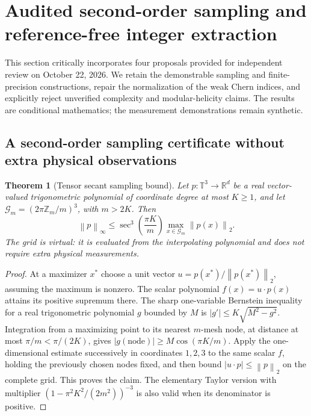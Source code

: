 \documentclass[aps,prd,onecolumn,notitlepage,11pt,superscriptaddress,longbibliography]{revtex4-2}
\newtheorem{theorem}{Theorem}
\newcommand{\norm}[1]{\left\lVert#1\right\rVert}
\begin{document}
\section{Audited second-order sampling and reference-free integer extraction}\label{sec:v6}

This section critically incorporates four proposals provided for independent review on October 22, 2026. We retain the demonstrable sampling and finite-precision constructions, repair the normalization of the weak Chern indices, and explicitly reject unverified complexity and modular-helicity claims. The results are conditional mathematics; the measurement demonstrations remain synthetic.

\subsection{A second-order sampling certificate without extra physical observations}

\begin{theorem}[Tensor secant sampling bound]\label{th:v6secant}
Let $p:\mathbb T^3\to\mathbb R^d$ be a real vector-valued trigonometric polynomial of coordinate degree at most $K\ge1$, and let $\mathcal G_m=(2\pi\mathbb Z_m/m)^3$, with $m>2K$. Then
\begin{equation}\label{eq:v6secant}
\boxed{\norm{p}_{\infty}\le \sec^3\!\left(\frac{\pi K}{m}\right)\max_{x\in\mathcal G_m}\norm{p(x)}_2.}
\end{equation}
The grid is \emph{virtual}: it is evaluated from the interpolating polynomial and does not require extra physical measurements.
\end{theorem}
\begin{proof}
At a maximizer $x^*$ choose a unit vector $u=p(x^*)/\norm{p(x^*)}_2$, assuming the maximum is nonzero. The scalar polynomial $f(x)=u\cdot p(x)$ attains its positive supremum there. The sharp one-variable Bernstein inequality for a real trigonometric polynomial $g$ bounded by $M$ is $|g'|\le K\sqrt{M^2-g^2}$. Integration from a maximizing point to its nearest $m$-mesh node, at distance at most $\pi/m<\pi/(2K)$, gives $|g(\mathrm{node})|\ge M\cos(\pi K/m)$. Apply the one-dimensional estimate successively in coordinates $1,2,3$ to the same scalar $f$, holding the previously chosen nodes fixed, and then bound $|u\cdot p|\le\norm{p}_2$ on the complete grid. This proves the claim. The elementary Taylor version with multiplier $(1-\pi^2 K^2/(2m^2))^{-3}$ is also valid when its denominator is positive.
\end{proof}
\end{document}

